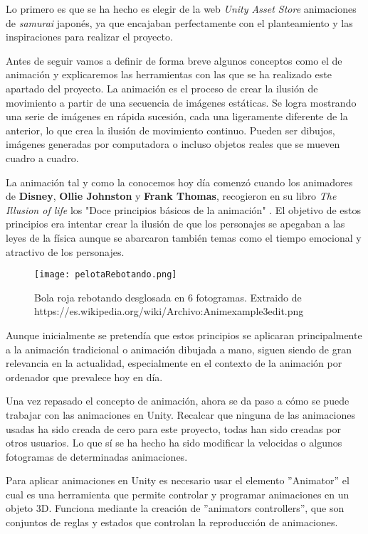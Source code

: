 Lo primero es que se ha hecho es elegir de la web \textit{Unity Asset Store} animaciones de \textit{samurai} japonés, ya que encajaban perfectamente con el planteamiento y las inspiraciones para realizar el proyecto.

 Antes de seguir vamos a definir de forma breve algunos conceptos como el de animación y explicaremos las herramientas con las que se ha realizado este apartado del proyecto. La animación es el proceso de crear la ilusión de movimiento a partir de una secuencia de imágenes estáticas. Se logra mostrando una serie de imágenes en rápida sucesión, cada una ligeramente diferente de la anterior, lo que crea la ilusión de movimiento continuo. Pueden ser dibujos, imágenes generadas por computadora o incluso objetos reales que se mueven cuadro a cuadro. 

 La animación \cite{Animacion} tal y como la conocemos hoy día comenzó cuando los animadores de \textbf{Disney}, \textbf{Ollie Johnston} y \textbf{Frank Thomas}, recogieron en su libro \textit{The Illusion of life} los "Doce principios básicos de la animación" \cite{TheIllusionOfLife}. El objetivo de estos principios era intentar crear la ilusión de que los personajes se apegaban a las leyes de la física aunque se abarcaron también temas como el tiempo emocional y atractivo de los personajes. 

 \begin{figure}[H]
    \centering
    \texttt{[image: pelotaRebotando.png]}
    \caption{Bola roja rebotando desglosada en 6 fotogramas. Extraido de https://es.wikipedia.org/wiki/Archivo:Animexample3edit.png }
\end{figure}

 Aunque inicialmente se pretendía que estos principios se aplicaran principalmente a la animación tradicional o animación dibujada a mano, siguen siendo de gran relevancia en la actualidad, especialmente en el contexto de la animación por ordenador que prevalece hoy en día.

Una vez repasado el concepto de animación, ahora se da paso a cómo se puede trabajar con las animaciones en Unity. Recalcar que ninguna de las animaciones usadas ha sido creada de cero para este proyecto, todas han sido creadas por otros usuarios. Lo que sí se ha hecho ha sido modificar la velocidas o algunos fotogramas de determinadas animaciones. 

Para aplicar animaciones en Unity es necesario usar el elemento ''Animator'' \cite{AnimatorUnity} el cual es una herramienta que permite controlar y programar animaciones en un objeto 3D. Funciona mediante la creación de ''animators controllers'', que son conjuntos de reglas y estados que controlan la reproducción de animaciones.

